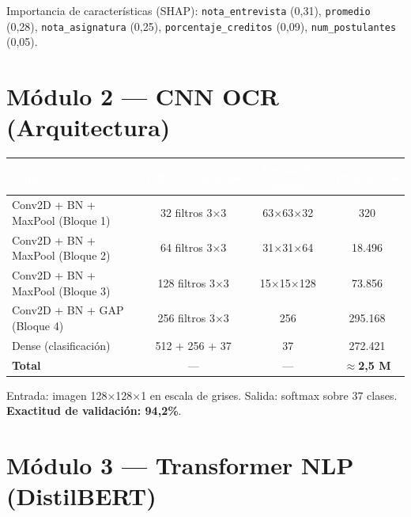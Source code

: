 \documentclass[12pt,a4paper,twoside]{report}
\begin{document}
Importancia de características (SHAP): \texttt{nota\_entrevista} (0,31), \texttt{promedio} (0,28),
\texttt{nota\_asignatura} (0,25), \texttt{porcentaje\_creditos} (0,09), \texttt{num\_postulantes} (0,05).

\section{Módulo 2 — CNN OCR (Arquitectura)}

\begin{center}
\begin{tabularx}{\textwidth}{|l|c|c|c|}
\hline
\rowcolor{tableHdr}
\textcolor{white}{\textbf{Capa}} & \textcolor{white}{\textbf{Filtros/Unidades}} &
\textcolor{white}{\textbf{Forma de Salida}} & \textcolor{white}{\textbf{Parámetros}} \\
\hline
\rowcolor{rowOdd}Conv2D + BN + MaxPool (Bloque 1) & 32 filtros 3×3 & 63×63×32 & 320 \\
\hline\rowcolor{rowEven}Conv2D + BN + MaxPool (Bloque 2) & 64 filtros 3×3 & 31×31×64 & 18.496 \\
\hline\rowcolor{rowOdd}Conv2D + BN + MaxPool (Bloque 3) & 128 filtros 3×3 & 15×15×128 & 73.856 \\
\hline\rowcolor{rowEven}Conv2D + BN + GAP (Bloque 4) & 256 filtros 3×3 & 256 & 295.168 \\
\hline\rowcolor{rowOdd}Dense (clasificación) & 512 + 256 + 37 & 37 & 272.421 \\
\hline\rowcolor{rowEven}\textbf{Total} & — & — & \textbf{$\approx$2,5 M} \\
\hline
\end{tabularx}
\end{center}

Entrada: imagen 128×128×1 en escala de grises. Salida: softmax sobre 37 clases. \textbf{Exactitud de validación: 94,2\%}.

\section{Módulo 3 — Transformer NLP (DistilBERT)}
\end{document}
